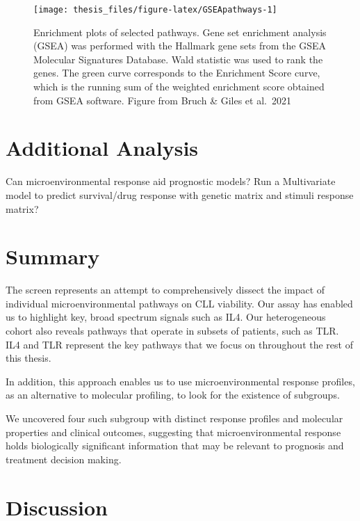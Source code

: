 \documentclass[11pt, a4paper, twosided]{book}
\begin{document}
\begin{figure}

{\centering \texttt{[image: thesis\_files/figure-latex/GSEApathways-1]} 

}

\caption{Enrichment plots of selected pathways. Gene set enrichment analysis (GSEA) was performed with the Hallmark gene sets from the GSEA Molecular Signatures Database. Wald statistic was used to rank the genes. The green curve corresponds to the Enrichment Score curve, which is the running sum of the weighted enrichment score obtained from GSEA software. Figure from Bruch \& Giles et al.~2021}\label{fig:GSEApathways}
\end{figure}
\hypertarget{additional-analysis}{%
\section{Additional Analysis}\label{additional-analysis}}

Can microenvironmental response aid prognostic models? Run a Multivariate model to predict survival/drug response with genetic matrix and stimuli response matrix?

\hypertarget{summary}{%
\section{Summary}\label{summary}}

The screen represents an attempt to comprehensively dissect the impact of individual microenvironmental pathways on CLL viability. Our assay has enabled us to highlight key, broad spectrum signals such as IL4. Our heterogeneous cohort also reveals pathways that operate in subsets of patients, such as TLR. IL4 and TLR represent the key pathways that we focus on throughout the rest of this thesis.

In addition, this approach enables us to use microenvironmental response profiles, as an alternative to molecular profiling, to look for the existence of subgroups.

We uncovered four such subgroup with distinct response profiles and molecular properties and clinical outcomes, suggesting that microenvironmental response holds biologically significant information that may be relevant to prognosis and treatment decision making.

\hypertarget{discussion}{%
\section{Discussion}\label{discussion}}
\end{document}
